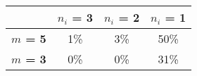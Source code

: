\begin{tabular}{|l|c|c|c|}
\hline
&\textbf{$n_i$ = 3}&\textbf{$n_i$ = 2}&\textbf{$n_i$ = 1}\\\hline
\textbf{$m$ = 5}&1\%&3\%&50\%\\\hline
\textbf{$m$ = 3}&0\%&0\%&31\%\\\hline
\end{tabular}
